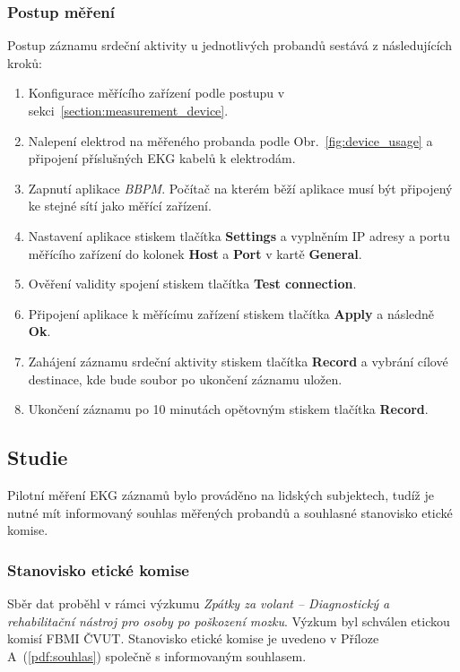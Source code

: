 \subsubsection{Postup měření}
\label{section:measurement_process}
Postup záznamu srdeční aktivity u jednotlivých probandů sestává z
následujících kroků:
\begin{enumerate}
    \item Konfigurace měřícího zařízení podle postupu v sekci~\ref{section:measurement_device}.
    \item Nalepení elektrod na měřeného probanda podle
          Obr.~\ref{fig:device_usage} a připojení příslušných EKG kabelů k elektrodám.
    \item Zapnutí aplikace \textit{BBPM}. Počítač na kterém běží aplikace musí
          být připojený ke stejné sítí jako měřící zařízení.
    \item Nastavení aplikace stiskem tlačítka \textbf{Settings} a vyplněním IP
          adresy a portu měřícího zařízení do kolonek \textbf{Host} a \textbf{Port} v
          kartě \textbf{General}.
    \item Ověření validity spojení stiskem tlačítka \textbf{Test connection}.
    \item Připojení aplikace k měřícímu zařízení stiskem tlačítka
          \textbf{Apply} a následně \textbf{Ok}.
    \item Zahájení záznamu srdeční aktivity stiskem tlačítka \textbf{Record} a
          vybrání cílové destinace, kde bude soubor po ukončení záznamu uložen.
    \item Ukončení záznamu po 10 minutách opětovným stiskem tlačítka \textbf{Record}.
\end{enumerate}

\subsection{Studie}
\label{section:study}
Pilotní měření EKG záznamů bylo prováděno na lidských subjektech, tudíž je nutné
mít informovaný souhlas měřených probandů a souhlasné stanovisko etické komise.

\subsubsection{Stanovisko etické komise}
Sběr dat proběhl v rámci výzkumu \textit{Zpátky za volant -- Diagnostický a
rehabilitační nástroj pro osoby po poškození mozku}. Výzkum byl schválen etickou
komisí FBMI ČVUT. Stanovisko etické komise je uvedeno v Příloze
A~(\ref{pdf:souhlas}) společně s informovaným souhlasem.

